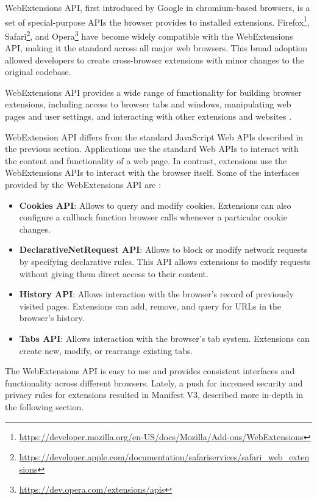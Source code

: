 WebExtensions API, first introduced by Google in chromium-based browsers, is a set of special-purpose APIs the browser provides to installed extensions. Firefox\footnote{\url{https://developer.mozilla.org/en-US/docs/Mozilla/Add-ons/WebExtensions}}, Safari\footnote{\url{https://developer.apple.com/documentation/safariservices/safari_web_extensions}}, and Opera\footnote{\url{https://dev.opera.com/extensions/apis}} have become widely compatible with the WebExtensions API, making it the standard across all major web browsers. This broad adoption allowed developers to create cross-browser extensions with minor changes to the original codebase.

WebExtensions API provides a wide range of functionality for building browser extensions, including access to browser tabs and windows, manipulating web pages and user settings, and interacting with other extensions and websites \cite{ChromeWebExtensionsAPIReference}.

WebExtension API differs from the standard JavaScript Web APIs described in the previous section. Applications use the standard Web APIs to interact with the content and functionality of a web page. In contrast, extensions use the WebExtensions APIs to interact with the browser itself. Some of the interfaces provided by the WebExtensions API are \cite{ChromeWebExtensionsAPIReference}:

\begin{itemize}
	\item \textbf{Cookies API}: Allows to query and modify cookies. Extensions can also configure a callback function browser calls whenever a particular cookie changes.
	\item \textbf{DeclarativeNetRequest API}: Allows to block or modify network requests by specifying declarative rules. This API allows extensions to modify requests without giving them direct access to their content.
	\item \textbf{History API}: Allows interaction with the browser's record of previously visited pages. Extensions can add, remove, and query for URLs in the browser's history.
	\item \textbf{Tabs API}: Allows interaction with the browser's tab system. Extensions can create new, modify, or rearrange existing tabs.
\end{itemize}

The WebExtensions API is easy to use and provides consistent interfaces and functionality across different browsers. Lately, a push for increased security and privacy rules for extensions resulted in Manifest V3, described more in-depth in the following section.

